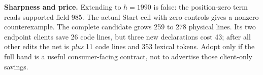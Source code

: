 \textbf{Sharpness and price.} Extending to \(h=1990\) is false: the position-zero term reads supported field 985. The actual Start cell with zero controls gives a nonzero counterexample. The complete candidate grows 259 to 278 physical lines. Its two endpoint clients save 26 code lines, but three new declarations cost 43; after all other edits the net is \emph{plus} 11 code lines and 353 lexical tokens. Adopt only if the full band is a useful consumer-facing contract, not to advertise those client-only savings.
